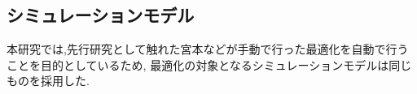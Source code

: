 \subsection{シミュレーションモデル}
本研究では,先行研究として触れた宮本などが手動で行った最適化を自動で行うことを目的としているため,
最適化の対象となるシミュレーションモデルは同じものを採用した.


